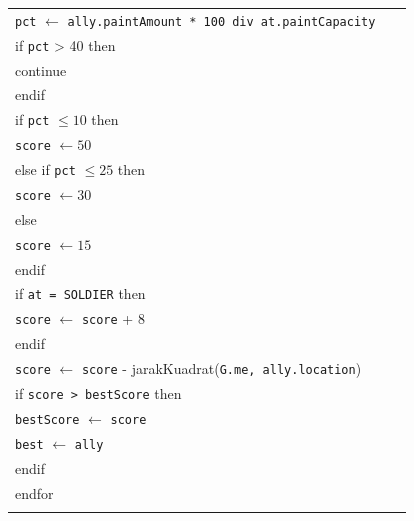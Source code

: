 \documentclass{article}
\newenvironment{pseudobox}
{
\centering
\begin{longtable}{|p{0.94\linewidth}|}
\hline
}
{
\\ \hline
\end{longtable}
\vspace{0.05cm}
}
\begin{document}
\begin{enumerate}[label=\alph*.]
\begin{enumerate}[label=\alph*.]
\begin{pseudobox}
\hspace*{3em}\texttt{pct} $\leftarrow$ \texttt{ally.paintAmount * 100 div at.paintCapacity} \\
\hspace*{3em}if \texttt{pct} > 40 then \\
\hspace*{4.5em}continue \\
\hspace*{3em}endif \\

\hspace*{3em}if \texttt{pct} $\leq 10$ then \\
\hspace*{4.5em}\texttt{score} $\leftarrow 50$ \\
\hspace*{3em}else if \texttt{pct} $\leq 25$ then \\
\hspace*{4.5em}\texttt{score} $\leftarrow 30$ \\
\hspace*{3em}else \\
\hspace*{4.5em}\texttt{score} $\leftarrow 15$ \\
\hspace*{3em}endif \\

\hspace*{3em}if \texttt{at = SOLDIER} then \\
\hspace*{4.5em}\texttt{score} $\leftarrow$ \texttt{score} + 8 \\
\hspace*{3em}endif \\

\hspace*{3em}\texttt{score} $\leftarrow$ \texttt{score} - jarakKuadrat(\texttt{G.me, ally.location}) \\

\hspace*{3em}if \texttt{score > bestScore} then \\
\hspace*{4.5em}\texttt{bestScore} $\leftarrow$ \texttt{score} \\
\hspace*{4.5em}\texttt{best} $\leftarrow$ \texttt{ally} \\
\hspace*{3em}endif \\
\hspace*{1.5em}endfor \\


\end{pseudobox}
\end{enumerate}
\end{enumerate}
\end{document}
